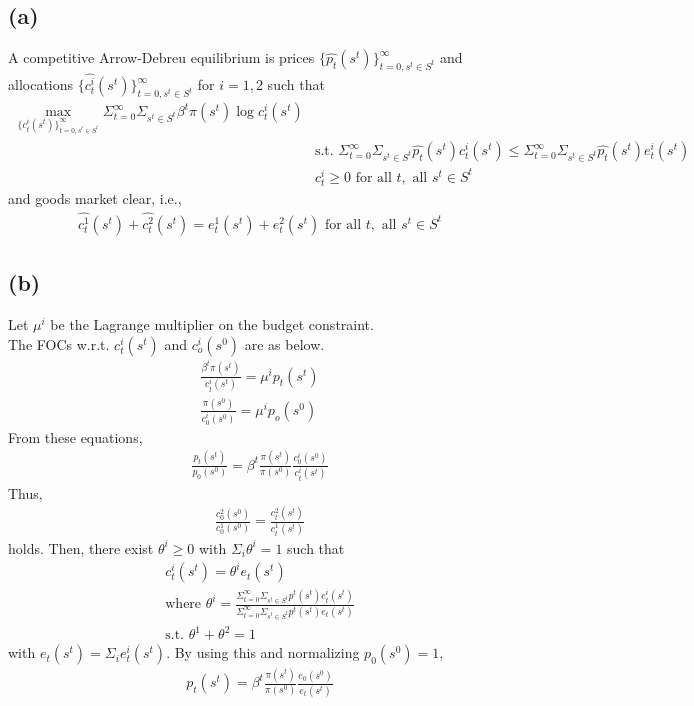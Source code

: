 \documentclass{ltjsarticle}
\begin{document}
\subsection*{(a)}
A competitive Arrow-Debreu equilibrium is prices $\{\hat{p_t}(s^t)\}_{t=0, s^t \in S^t}^\infty$ and allocations $\{\hat{c_t^i}(s^t)\}_{t=0, s^t \in S^t}^\infty$ for $i = 1, 2$ such that
\begin{align*}
    \max_{\{c_t^i(s^t)\}_{t=0, s^t \in S^t}^\infty} \Sigma_{t=0}^\infty \Sigma_{s^t \in S^t} \beta^t \pi(s^t) \log c^i_t(s^t)\\
    & \text{s.t. }\Sigma_{t=0}^\infty \Sigma_{s^t \in S^t} \hat{p_t}(s^t) c^i_t(s^t) \leq \Sigma_{t=0}^\infty \Sigma_{s^t \in S^t} \hat{p_t}(s^t) e^i_t(s^t)\\
    & c^i_t \geq 0 \text{ for all }t,\text{ all }s^t \in S^t
\end{align*}
and goods market clear, i.e.,
\begin{align*}
    \hat{c^1_t}(s^t) + \hat{c^2_t}(s^t) = e^1_t(s^t) + e^2_t(s^t) \text{ for all } t, \text{ all } s^t \in S^t
\end{align*}

\subsection*{(b)}
Let $\mu^i$ be the Lagrange multiplier on the budget constraint.\\
The FOCs w.r.t. $c^i_t(s^t)$ and $c_o^i(s^0)$ are as below.
\begin{align*}
    \frac{\beta^t \pi(s^t)}{c^i_t(s^t)} = \mu^i p_t(s^t)\\
    \frac{\pi(s^0)}{c_0^i(s^0)} = \mu^i p_o(s^0)
\end{align*}
From these equations,
\begin{align*}
    \frac{p_t(s^t)}{p_0(s^0)} = \beta^t \frac{\pi(s^t)}{\pi(s^0)} \frac{c_0^i(s^0)}{c_t^i(s^t)}
\end{align*}
Thus,
\begin{align*}
    \frac{c_0^2(s^0)}{c_0^1(s^0)} = \frac{c_t^2(s^t)}{c_t^1(s^t)}
\end{align*}
holds.
Then, there exist $\theta^i \geq 0$ with $\Sigma_i \theta^i = 1$ such that
\begin{align*}
    c_t^i(s^t) = \theta^i e_t(s^t)\\
    \text{where }\theta^i = \frac{\Sigma_{t=0}^\infty \Sigma_{s^t \in S^t} p^t(s^t) e_t^i (s^t)}{\Sigma_{t=0}^\infty \Sigma_{s^t \in S^t} p^t(s^t) e_t (s^t)}\\
    \text{s.t. }\theta^1 + \theta^2 = 1
\end{align*}
with $e_t(s^t) = \Sigma_i e_t^i (s^t)$.
By using this and normalizing $p_0(s^0) = 1$,
\begin{align*}
    p_t(s^t) = \beta^t \frac{\pi(s^t)}{\pi(s^0)}\frac{e_0(s^0)}{e_t(s^t)}
\end{align*}
\end{document}
